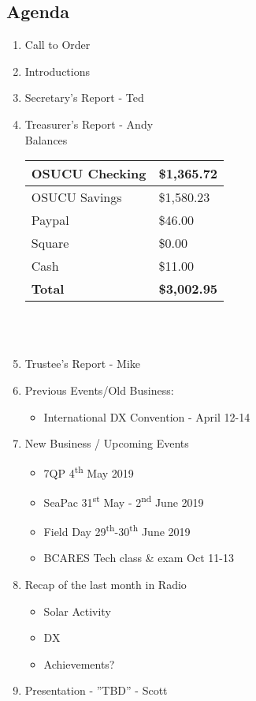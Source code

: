 \documentclass[letter,11pt]{extarticle}
\begin{document}
	\subsection*{Agenda}
	\begin{enumerate}
		\item Call to Order
		\item Introductions
		\item Secretary's Report - Ted
		\item Treasurer's Report - Andy \\
				Balances 
			\begin{tabular}{|l|l|} \hline
				OSUCU Checking & \$1,365.72 \\ \hline
				OSUCU Savings & \$1,580.23 \\ \hline
				Paypal & \$46.00 \\ \hline
				Square & \$0.00 \\ \hline
				Cash & \$11.00 \\ \hline
				\textbf{Total} & \textbf{\$3,002.95} \\ \hline
			\end{tabular} \\ \\
		\item Trustee's Report - Mike
		\item Previous Events/Old Business:
		\begin{itemize}
				\item International DX Convention - April 12-14
		\end{itemize}
			
		\item  New Business / Upcoming Events
			\begin{itemize}
				\item 7QP 4\textsuperscript{th} May 2019
				\item SeaPac 31\textsuperscript{st} May - 2\textsuperscript{nd} June 2019
				\item Field Day 29\textsuperscript{th}-30\textsuperscript{th} June 2019
				\item BCARES Tech class \& exam Oct 11-13
			\end{itemize}
		\item Recap of the last month in Radio
			\begin{itemize}
				\item Solar Activity
				\item DX
				\item Achievements?
			\end{itemize}
		\item  Presentation - ''TBD'' - Scott

	\end{enumerate}
\end{document}
